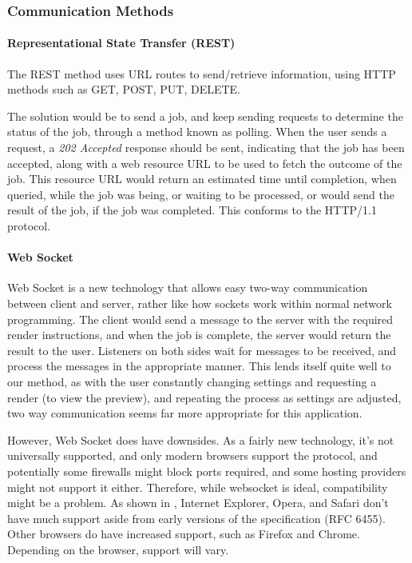 \documentclass[11pt,a4paper]{article}
\begin{document}
\subsubsection{Communication Methods}
\paragraph{Representational State Transfer (REST)}
The REST method uses URL routes to send/retrieve information, using HTTP methods such as
GET, POST, PUT, DELETE.

The solution would be to send a job, and keep sending requests to determine the status of the job, through a
method known as polling. When the user sends a request, a \emph{202 Accepted} response should be sent,
indicating that the job has been accepted, along with a web resource URL to be used to fetch the outcome of
the job. This resource URL would return an estimated time until completion, when queried, while the job was being, or waiting to be processed,
or would send the result of the job, if the job was completed. This conforms to the HTTP/1.1 protocol. \cite{RESTandLongRunningJobs}


\paragraph{Web Socket}
Web Socket is a new technology that allows easy two-way communication between client and server, rather like how
sockets work within normal network programming. The client would send a message to the server with the required
render instructions, and when the job is complete, the server would return the result to the user. Listeners on both
sides wait for messages to be received, and process the messages in the appropriate manner.
\cite{WebsocketSpec}
This lends itself quite well to our method, as with the user constantly changing settings and requesting a render (to
view the preview), and repeating the process as settings are adjusted, two way communication seems far more appropriate
for this application.

However, Web Socket does have downsides. As a fairly new technology, it's not universally supported, and only modern browsers
support the protocol, and potentially some firewalls might block ports required, and some hosting providers might not support 
it either. Therefore, while websocket is ideal, compatibility might be a problem. As shown in \cite{WebSocketDeveloper},
Internet Explorer, Opera, and Safari don't have much support aside from early versions of the specification (RFC 6455). Other browsers
do have increased support, such as Firefox and Chrome. Depending on the browser, support will vary.
\end{document}
